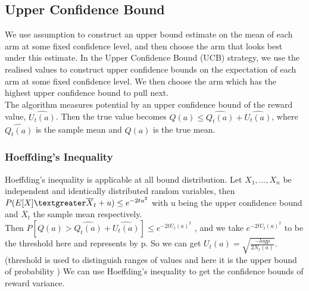 \subsection{Upper Confidence Bound}
We use assumption to construct an upper bound estimate on the mean of each arm at some fixed confidence level, and then choose the arm that looks best under this estimate. \citep{SVGarbar2012} In the Upper Confidence Bound (UCB) strategy, we use the realised values to construct upper confidence bounds on the expectation of each arm at some fixed confidence level. We then choose the arm which has the highest upper confidence bound to pull next. 
\\The algorithm measures potential by an upper confidence bound of the reward value, $\widehat{U_t (a)}$. Then the true value becomes $ Q(a)  \leq \widehat{Q_t (a)}+\widehat{U_t (a)} $, where  $ \widehat{Q_t (a)}$ is the sample mean
and $ Q(a)$ is the true mean.
\subsubsection{Hoeffding’s Inequality}
Hoeffding's inequality is applicable at all bound distribution. Let $X_1, ..., X_n$ be independent and identically distributed random variables, then $ P(E[X]  \textgreater \overline  X_t + u) \leq e^{-2t u^2}$ with u being the upper confidence bound and $ \overline X_t $ the sample mean respectively. \citep{Hoeffding1963}
\\Then $ P[Q(a) >\widehat{Q_t (a)}+\widehat{U_t (a)}] \leq e^{-2t U_t(a)^2}$ , and we take $e^{-2t U_t(a)^2} $ to be the threshold here and represents by p. So we can get $U_t(a) = \sqrt{\frac{-log p}{2N_t (a)}}$.(threshold is used to distinguish ranges of values and here it is the upper bound of probability )
We can use Hoeffding's inequality to get the confidence bounds of reward variance.

